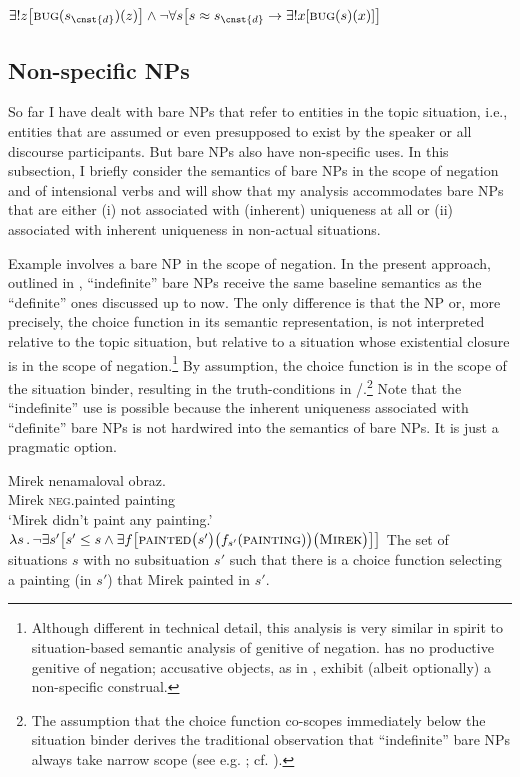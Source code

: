 \documentclass[output=paper,colorlinks,citecolor=brown,newtxmath]{langscibook}
\begin{document}
\ea $\exists!z\big[\textsc{bug}(s_{\cnst{d}})(z)\big]\wedge\neg\forall s\big[s\approx s_{\cnst{d}}\rightarrow\exists!x[\textsc{bug}(s)(x)]\big]$\label{simik:ex:bug}
\z

\subsection{Non-specific NPs}\label{simik:sec:non-sp}

So far I have dealt with bare NPs that refer to entities in the topic situation, i.e., entities that are assumed or even presupposed to exist by the speaker or all discourse participants. But bare NPs also have non-specific uses. In this subsection, I briefly consider the semantics of bare NPs in the scope of negation and of intensional verbs and will show that my analysis accommodates bare NPs that are either (i) not associated with (inherent) uniqueness at all or (ii) associated with inherent uniqueness in non-actual situations.

Example  involves a bare NP in the scope of negation. In the present approach, outlined in , ``indefinite'' bare NPs receive the same baseline semantics as the ``definite'' ones discussed up to now. The only difference is that the NP or, more precisely, the choice function in its semantic representation, is not interpreted relative to the topic situation, but relative to a situation whose existential closure is in the scope of negation.\footnote{Although different in technical detail, this analysis is very similar in spirit to  situation-based semantic analysis of  genitive of negation.  has no productive genitive of negation; accusative objects, as in , exhibit (albeit optionally) a non-specific construal.} By assumption, the choice function is in the scope of the situation binder, resulting in the truth-conditions in /.\footnote{The assumption that the choice function co-scopes immediately below the situation binder derives the traditional observation that ``indefinite'' bare NPs always take narrow scope (see e.g. \citealt{Dayal2004,Geist2010}; cf. \citealt{Borik2016}).} Note that the ``indefinite'' use is possible because the inherent uniqueness associated with ``definite'' bare NPs is not hardwired into the semantics of bare NPs. It is just a pragmatic option.

\ea\ea\label{simik:ex:paint-a}\gll Mirek nenamaloval obraz.\\
Mirek \textsc{neg.}painted painting\\
\glt `Mirek didn't paint any painting.'
\ex $\lambda s\,.\,\neg\exists s'
\big[s'\leq s
\wedge\exists f\big[\textsc{painted}\big(s'\big)\big(f_{s'}(\textsc{painting})\big)\big(\textsc{Mirek}\big)\big]\big]$\label{simik:ex:paint-b}
\ex The set of situations $s$ with no subsituation $s'$ such that there is a choice function selecting a painting (in $s'$) that Mirek painted in $s'$.\label{simik:ex:paint-c}
\z\z
\end{document}
